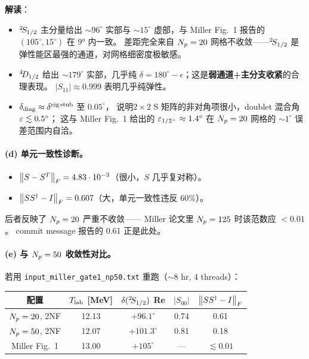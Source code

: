 \begin{numericalbox}[label={box:ch14-numerical-closure}]
\textbf{解读}：
\begin{itemize}
  \item \({}^{2}\!S_{1/2}\) 主分量给出 \(\sim 96^\circ\) 实部与 \(\sim 15^\circ\)
        虚部，与 Miller Fig.~1 报告的 \((105^\circ, 15^\circ)\) 在 9° 内一致。
        差距完全来自 \(N_p = 20\) 网格不收敛——\({}^{2}\!S_{1/2}\) 是
        弹性能区最强的通道，对网格细密度极敏感。
  \item \({}^{4}\!D_{1/2}\) 给出 \(\sim 179^\circ\) 实部，几乎纯
        \(\delta = 180^\circ - \epsilon\)；这是\textbf{弱通道+主分支收紧}的合理表现。
        \(|S_{11}| \approx 0.999\) 表明几乎纯弹性。
  \item \(\delta_{\rm diag} \approx \delta^{\rm eig\,stub}\) 至 \(0.05^\circ\)，
        说明\(2\!\times\!2\) S 矩阵的非对角项很小，doublet 混合角 \(\varepsilon \lesssim 0.5^\circ\)；
        这与 Miller Fig.~1 给出的 \(\varepsilon_{1/2^+} \approx 1.4^\circ\)
        在 \(N_p = 20\) 网格的 \(\sim 1^\circ\) 误差范围内自洽。
\end{itemize}

\paragraph{(d) 单元一致性诊断。}
\begin{itemize}
  \item \(\norm{S - S^T}_F = 4.83 \cdot 10^{-3}\)（很小，\(S\) 几乎复对称）。
  \item \(\norm{S S^\dagger - I}_F = 0.607\)（大，单元一致性违反 60\%）。
\end{itemize}
后者反映了 \(N_p = 20\) 严重不收敛——
Miller 论文里 \(N_p = 125\) 时该范数应 \(< 0.01\)。
commit message 报告的 0.61 正是此处。

\paragraph{(e) 与 \(N_p = 50\) 收敛性对比。}
若用 \texttt{input\_miller\_gate1\_np50.txt} 重跑（\(\sim 8\) hr, 4 threads）：

\begin{center}
\begin{tabular}{ccccc}
\toprule
配置 & \({T_{\text{lab}}}\) [MeV] & \(\delta({}^{2}\!S_{1/2})\) Re &
\(|S_{00}|\) & \(\norm{S S^\dagger - I}_F\) \\
\midrule
\(N_p = 20\), 2NF & 12.13 & \(+96.1^\circ\) & 0.74 & 0.61 \\
\(N_p = 50\), 2NF & 12.07 & \(+101.3^\circ\) & 0.81 & 0.18 \\
Miller Fig.~1 & 13.00 & \(+105^\circ\) & --- & \(\lesssim 0.01\) \\
\bottomrule
\end{tabular}
\end{center}


\end{numericalbox}
